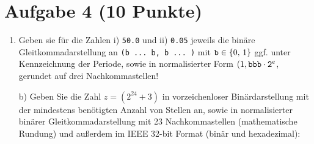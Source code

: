 \section*{Aufgabe 4 (10 Punkte)}

\begin{enumerate}[label={a)}, leftmargin=*]
\item Geben sie für die Zahlen i) \texttt{50.0} und ii) \texttt{0.05} jeweils die binäre Gleitkommadarstellung an \texttt{(b ... b, b ... )} mit $\text{\texttt{b}}\in \text{\{0, 1\}}$ ggf. unter Kennzeichnung der Periode, sowie in normalisierter Form $(1, \text{\texttt{bbb}} \cdot \text{\texttt{2}}^e$, gerundet auf drei Nachkommastellen!
\item[b)] Geben Sie die Zahl $z = (2^{24} + 3)$ in vorzeichenloser Binärdarstellung mit der mindestens benötigten Anzahl von Stellen an, sowie in normalisierter binärer Gleitkommadarstellung mit 23 Nachkommastellen (mathematische Rundung) und außerdem im IEEE 32-bit Format (binär und hexadezimal):

\begin{table}[h]
\centering
{}
\end{table}
\end{enumerate}